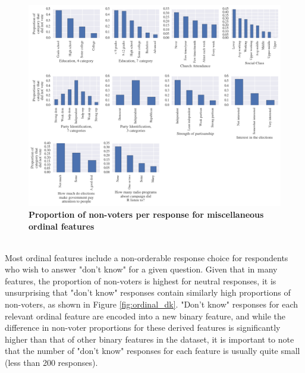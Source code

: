 \documentclass{article}
\begin{document}
	\newpage
	\begin{figure}[h!]
		\begin{center}
			\includegraphics*[width=1\linewidth]{ordinal_other}
			\caption{\textbf{Proportion of non-voters per response for miscellaneous ordinal features}}
			\label{fig:ordinal_other}
		\end{center}
	\end{figure}
	\newpage
	\hfill \\
	Most ordinal features include a non-orderable response choice for respondents who wish to answer "don't know" for a given question. Given that in many features, the proportion of non-voters is highest for neutral responses, it is unsurprising that "don't know" responses contain similarly high proportions of non-voters, as shown in Figure \ref{fig:ordinal_dk}. "Don't know" responses for each relevant ordinal feature are encoded into a new binary feature, and while the difference in non-voter proportions for these derived features is significantly higher than that of other binary features in the dataset, it is important to note that the number of "don't know" responses for each feature is usually quite small (less than 200 responses).
\end{document}

